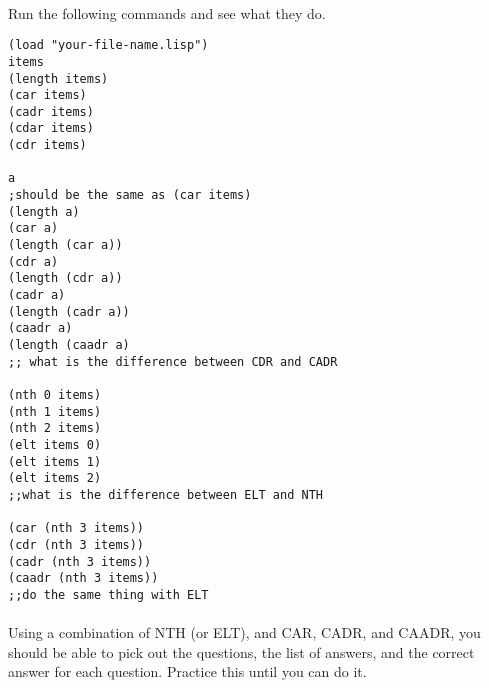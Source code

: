 \documentclass{article}
\begin{document}
\paragraph{}Run the following commands and see what they do.

\begin{multicols}{2}
\begin{lstlisting}
(load "your-file-name.lisp")
items
(length items)
(car items)
(cadr items)
(cdar items)
(cdr items)

a 
;should be the same as (car items)
(length a)
(car a)
(length (car a))
(cdr a)
(length (cdr a))
(cadr a)
(length (cadr a))
(caadr a)
(length (caadr a)
;; what is the difference between CDR and CADR

(nth 0 items)
(nth 1 items)
(nth 2 items)
(elt items 0)
(elt items 1)
(elt items 2)
;;what is the difference between ELT and NTH

(car (nth 3 items))
(cdr (nth 3 items))
(cadr (nth 3 items))
(caadr (nth 3 items))
;;do the same thing with ELT
\end{lstlisting}
\end{multicols}

\paragraph{}Using a combination of NTH (or ELT), and CAR, CADR, and CAADR, you should be able to pick out the questions, the list of answers, and the correct answer for each question. Practice this until you can do it.
\end{document}
